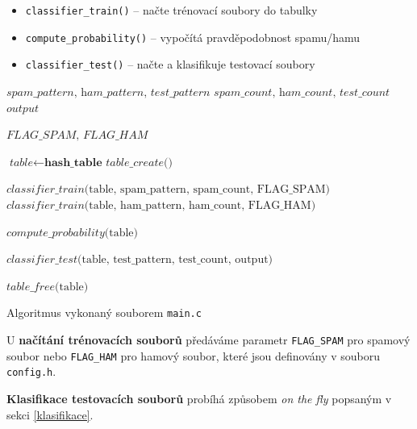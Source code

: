 \documentclass[12pt]{report}
\begin{document}
 	\begin{itemize}
 		\item \texttt{classifier\_train()} – načte trénovací soubory do tabulky
 		\item \texttt{compute\_probability()} – vypočítá pravděpodobnost spamu/hamu
 		\item \texttt{classifier\_test()} – načte a klasifikuje testovací soubory
 	\end{itemize}
 	
 	\begin{algorithm}
 		\begin{algorithmic}[1]
 		
 			\State $\textit{spam\_pattern, ham\_pattern, test\_pattern}$
 			\State $\textit{spam\_count, ham\_count, test\_count}$
 			\State $\textit{output}$
 		
 			\State $\textit{FLAG\_SPAM, FLAG\_HAM}$
 		
 			\State $\textit{table} \gets \textbf{hash\_table} \textit{ table\_create()}$
 		
 			\State $\textit{classifier\_train}\text{(table, spam\_pattern, spam\_count, FLAG\_SPAM)}$
 			\State $\textit{classifier\_train}\text{(table, ham\_pattern, ham\_count, FLAG\_HAM)}$
 		
 			\State $\textit{compute\_probability}\text{(table)}$
 		
 			\State $\textit{classifier\_test}\text{(table, test\_pattern, test\_count, output)}$
 		
 			\State $\textit{table\_free}\text{(table)}$
 		
 			\EndProcedure
 		\end{algorithmic} 	
 		\caption{Algoritmus vykonaný souborem \texttt{main.c}}
 		\label{alg:mainAlgo}
 	\end{algorithm}
 
 	U \textbf{načítání trénovacích souborů} předáváme parametr \texttt{FLAG\_SPAM} pro spamový soubor nebo \texttt{FLAG\_HAM} pro hamový soubor, které jsou definovány v souboru \texttt{config.h}.
 	
 	\textbf{Klasifikace testovacích souborů} probíhá způsobem \textit{on the fly} popsaným v sekci \ref{klasifikace}.
 	 	
\end{document}
